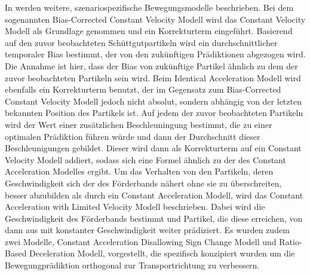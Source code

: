 In \cite{Pfaff2018} werden weitere, szenariospezifische Bewegungsmodelle beschrieben.
Bei dem sogenannten Bias-Corrected Constant Velocity Modell wird das Constant Velocity Modell als Grundlage genommen und ein Korrekturterm eingeführt.
Basierend auf den zuvor beobachteten Schüttgutpartikeln wird ein durchschnittlicher temporaler Bias bestimmt, der von den zukünftigen Prädiktionen abgezogen wird.
Die Annahme ist hier, dass der Bias von zukünftige Partikel ähnlich zu dem der zuvor beobachteten Partikeln sein wird.
Beim Identical Acceleration Modell wird ebenfalls ein Korrekturterm benutzt, 
der im Gegensatz zum Bias-Corrected Constant Velocity Modell jedoch nicht absolut, sondern abhängig von der letzten bekannten Position des Partikels ist.
Auf jedem der zuvor beobachteten Partikeln wird der Wert einer zusätzlichen Beschleuningung bestimmt, die zu einer optimalen Prädiktion führen würde und dann der Durchschnitt dieser Beschleunigungen gebildet.
Dieser wird dann als Korrekturterm auf ein Constant Velocity Modell addiert, sodass sich eine Formel ähnlich zu der des Constant Acceleration Modelles ergibt.
Um das Verhalten von den Partikeln, deren Geschwindigkeit sich der des Förderbands nähert ohne sie zu überschreiten, besser abzubilden als durch ein Constant Acceleration Modell,
wird das Constant Acceleration with Limited Velocity Modell beschrieben. 
Dabei wird die Geschwindigkeit des Förderbands bestimmt und Partikel, die diese erreichen, von dann aus mit konstanter Geschwindigkeit weiter prädiziert.
Es wurden zudem zwei Modelle, Constant Acceleration Disallowing Sign Change Modell und Ratio-Based Deceleration Modell, vorgestellt, 
die spezifisch konzipiert wurden um die Bewegungprädiktion orthogonal zur Transportrichtung zu verbessern.

